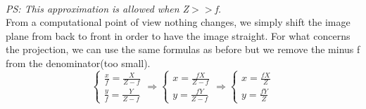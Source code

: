 \\\textit{PS: This approximation is allowed when Z$>>$f.}
\\From a computational point of view nothing changes, we simply shift the image plane from back to front in order to have the image straight. For what concerns the projection, we can use the same formulas as before but we remove the minus f from the denominator(too small).
\[
    \begin{cases}
        \frac{x}{f} = \frac{X}{Z-f} \\
        \frac{y}{f} = \frac{Y}{Z-f}
    \end{cases} \Rightarrow \begin{cases}
        x = \frac{fX}{Z-f} \\
        y = \frac{fY}{Z-f}
    \end{cases} \Rightarrow \begin{cases}
        x = \frac{fX}{Z} \\
        y = \frac{fY}{Z}
    \end{cases}
\]

